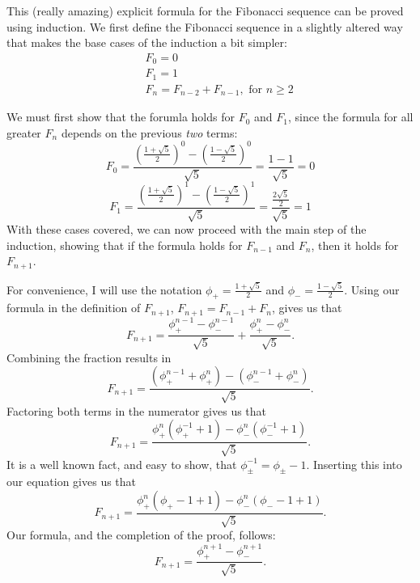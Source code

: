 \begin{problem}[2-20]
This (really amazing) explicit formula for the Fibonacci sequence can be proved using induction. We first define the Fibonacci sequence in a slightly altered way that makes the base cases of the induction a bit simpler:
\begin{eqnarray*}
 && F_0 = 0 \\
 && F_1 = 1 \\
 && F_n = F_{n-2} + F_{n-1}, \textrm{   for } n \ge 2
\end{eqnarray*}

We must first show that the forumla holds for $F_0$ and $F_1$, since the formula for all greater $F_n$ depends on the previous \textit{two} terms:
\[ F_0 = \frac{(\frac{1 + \sqrt{5}}{2})^0 - (\frac{1 - \sqrt{5}}{2})^0}{\sqrt{5}} = \frac{1 - 1}{\sqrt{5}} = 0 \]
\[ F_1 = \frac{(\frac{1 + \sqrt{5}}{2})^1 - (\frac{1 - \sqrt{5}}{2})^1}{\sqrt{5}} = \frac{\frac{2\sqrt{5}}{2}}{\sqrt{5}} = 1 \]
With these cases covered, we can now proceed with the main step of the induction, showing that if the formula holds for $F_{n - 1}$ and $F_n$, then it holds for $F_{n+1}$.

For convenience, I will use the notation $\phi_+ = \frac{1 + \sqrt{5}}{2}$ and $\phi_- = \frac{1 - \sqrt{5}}{2}$. Using our formula in the definition of $F_{n+1}$, $F_{n+1} = F_{n-1} + F_n$, gives us that 
\[ F_{n+1} =  \frac{\phi_+^{n-1} - \phi_-^{n-1}}{\sqrt{5}} + \frac{\phi_+^n - \phi_-^n}{\sqrt{5}}.\]
Combining the fraction results in
\[ F_{n+1} =  \frac{(\phi_+^{n-1} + \phi_+^n) - (\phi_-^{n-1} + \phi_-^n)}{\sqrt{5}}.\]
Factoring both terms in the numerator gives us that
\[ F_{n+1} =  \frac{\phi_+^n(\phi_+^{-1} + 1) - \phi_-^n(\phi_-^{-1} + 1)}{\sqrt{5}}.\]
It is a well known fact, and easy to show, that $\phi_\pm^{-1} = \phi_\pm - 1$. Inserting this into our equation gives us that
\[ F_{n+1} =  \frac{\phi_+^n(\phi_+ - 1 + 1) - \phi_-^n(\phi_- - 1 + 1)}{\sqrt{5}}.\]
Our formula, and the completion of the proof, follows:
\[ F_{n+1} =  \frac{\phi_+^{n+1} - \phi_-^{n+1}}{\sqrt{5}}.\]
\end{problem}
